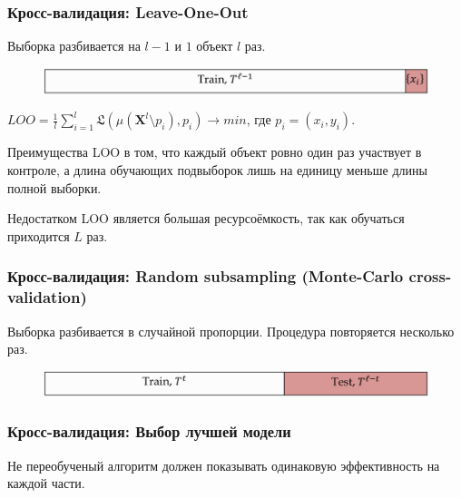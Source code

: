 \documentclass[11pt]{beamer}
\begin{document}
	\begin{frame}
		\frametitle{Кросс-валидация: Leave-One-Out}
		Выборка разбивается на $ l-1 $ и $ 1 $ объект $ l $ раз.
		\begin{figure}
			\includegraphics[width=1\linewidth]{imgs/LeaveOneOut}
		\end{figure}
		$LOO = \frac{1}{l}\sum\limits_{i=1}^l\mathfrak{L}(\mu(\bm{X}^l \setminus p_i), p_i) \rightarrow min$, где $ p_i = (x_i, y_i) $.
		
		Преимущества LOO в том, что каждый объект ровно один раз участвует в контроле, а длина обучающих подвыборок лишь на единицу меньше длины полной выборки.
		
		Недостатком LOO является большая ресурсоёмкость, так как обучаться приходится $ L $ раз.
	\end{frame}

	\begin{frame}
		\frametitle{Кросс-валидация: Random subsampling (Monte-Carlo cross-validation)}
		Выборка разбивается в случайной пропорции. Процедура повторяется несколько раз.
		\begin{figure}
			\includegraphics[width=1\linewidth]{imgs/completecrossvalidation}
		\end{figure}
	\end{frame}
	
	\begin{frame}
		\frametitle{Кросс-валидация: Выбор лучшей модели}
		Не переобученый алгоритм должен показывать одинаковую эффективность на каждой части.
	\end{frame}
\end{document}
